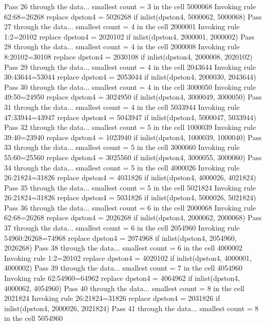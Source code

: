 Pass 26 through the data...
  smallest count = 3 in the cell      5000068
  Invoking rule 62:68=26268
  replace dpston4 = 5026268 if inlist(dpston4, 5000062, 5000068)
Pass 27 through the data...
  smallest count = 4 in the cell      2000001
  Invoking rule 1:2=20102
  replace dpston4 = 2020102 if inlist(dpston4, 2000001, 2000002)
Pass 28 through the data...
  smallest count = 4 in the cell      2000008
  Invoking rule 8:20102=30108
  replace dpston4 = 2030108 if inlist(dpston4, 2000008, 2020102)
Pass 29 through the data...
  smallest count = 4 in the cell      2043644
  Invoking rule 30:43644=53044
  replace dpston4 = 2053044 if inlist(dpston4, 2000030, 2043644)
Pass 30 through the data...
  smallest count = 4 in the cell      3000050
  Invoking rule 49:50=24950
  replace dpston4 = 3024950 if inlist(dpston4, 3000049, 3000050)
Pass 31 through the data...
  smallest count = 4 in the cell      5033944
  Invoking rule 47:33944=43947
  replace dpston4 = 5043947 if inlist(dpston4, 5000047, 5033944)
Pass 32 through the data...
  smallest count = 5 in the cell      1000039
  Invoking rule 39:40=23940
  replace dpston4 = 1023940 if inlist(dpston4, 1000039, 1000040)
Pass 33 through the data...
  smallest count = 5 in the cell      3000060
  Invoking rule 55:60=25560
  replace dpston4 = 3025560 if inlist(dpston4, 3000055, 3000060)
Pass 34 through the data...
  smallest count = 5 in the cell      4000026
  Invoking rule 26:21824=31826
  replace dpston4 = 4031826 if inlist(dpston4, 4000026, 4021824)
Pass 35 through the data...
  smallest count = 5 in the cell      5021824
  Invoking rule 26:21824=31826
  replace dpston4 = 5031826 if inlist(dpston4, 5000026, 5021824)
Pass 36 through the data...
  smallest count = 6 in the cell      2000068
  Invoking rule 62:68=26268
  replace dpston4 = 2026268 if inlist(dpston4, 2000062, 2000068)
Pass 37 through the data...
  smallest count = 6 in the cell      2054960
  Invoking rule 54960:26268=74968
  replace dpston4 = 2074968 if inlist(dpston4, 2054960, 2026268)
Pass 38 through the data...
  smallest count = 6 in the cell      4000002
  Invoking rule 1:2=20102
  replace dpston4 = 4020102 if inlist(dpston4, 4000001, 4000002)
Pass 39 through the data...
  smallest count = 7 in the cell      4054960
  Invoking rule 62:54960=64962
  replace dpston4 = 4064962 if inlist(dpston4, 4000062, 4054960)
Pass 40 through the data...
  smallest count = 8 in the cell      2021824
  Invoking rule 26:21824=31826
  replace dpston4 = 2031826 if inlist(dpston4, 2000026, 2021824)
Pass 41 through the data...
  smallest count = 8 in the cell      5054960
